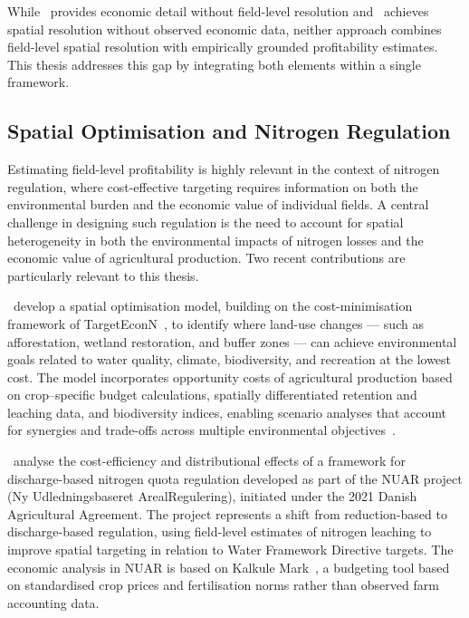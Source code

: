 \documentclass[12pt]{article}
\begin{document}
While~\citet{Jensen2010} provides economic detail without field-level resolution and~\citet{Pedersen2022} achieves spatial resolution without observed economic data, neither approach combines field-level spatial resolution with empirically grounded profitability estimates. This thesis addresses this gap by integrating both elements within a single framework.



\subsection{Spatial Optimisation and Nitrogen Regulation}

Estimating field-level profitability is highly relevant in the context of nitrogen regulation, where cost-effective targeting requires information on both the environmental burden and the economic value of individual fields. A central challenge in designing such regulation is the need to account for spatial 
heterogeneity in both the environmental impacts of nitrogen losses and the economic value of agricultural production. 
Two recent contributions are particularly relevant to this thesis.

\cite{Termansen2023}~develop a spatial optimisation model, building on the cost-minimisation framework of TargetEconN~\citep{Hansen2019}, to identify where land-use changes --- such as afforestation, wetland restoration, and buffer zones --- can achieve environmental goals related to water quality, climate, biodiversity, and recreation at the lowest cost. The model incorporates opportunity costs of agricultural production based on crop--specific budget calculations, spatially differentiated retention and leaching data, and biodiversity indices, enabling scenario analyses that account for synergies and trade-offs across multiple environmental objectives~\citep{Termansen2023}.

\cite{Olsen2026}~analyse the cost-efficiency and distributional effects of a framework for discharge-based nitrogen quota regulation developed as part of the NUAR project (Ny Udledningsbaseret ArealRegulering), initiated under the 2021 Danish Agricultural Agreement. The project represents a shift from reduction-based to discharge-based regulation, using field-level estimates of nitrogen leaching to improve spatial targeting in relation to Water Framework Directive targets. The economic analysis in NUAR is based on Kalkule Mark~\citep{Hvid2023}, a budgeting tool based on standardised crop prices and fertilisation norms rather than observed farm accounting data.
 
\end{document}
